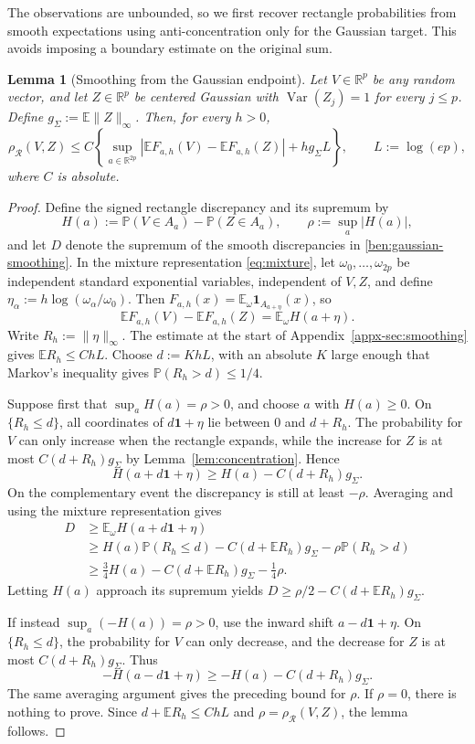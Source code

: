 \documentclass[11pt,letterpaper]{article}
\newtheorem{lemma}{Lemma}
\theoremstyle{remark}
\newcommand{\E}{\mathbb E}
\newcommand{\Pp}{\mathbb P}
\newcommand{\R}{\mathbb R}
\newcommand{\Var}{\operatorname{Var}}
\newcommand{\rh}{\rho_{\mathcal R}}
\newcommand{\ind}{\mathbf 1}
\begin{document}
The observations are unbounded, so we first recover rectangle
probabilities from smooth expectations using anti-concentration
only for the Gaussian target. This avoids imposing a boundary
estimate on the original sum.

\begin{lemma}[Smoothing from the Gaussian endpoint]\label{ben:smoothing}
Let $V\in\R^p$ be any random vector, and let $Z\in\R^p$
be centered Gaussian with $\Var(Z_j)=1$ for every $j\le p$.
Define $g_\Sigma:=\E\|Z\|_\infty$. Then, for every $h>0$,
\begin{equation}\label{ben:gaussian-smoothing}
 \rh(V,Z)\le C\left\{
 \sup_{a\in\R^{2p}}|\E F_{a,h}(V)-\E F_{a,h}(Z)|
       +hg_\Sigma L\right\},\qquad L:=\log(ep),
\end{equation}
where $C$ is absolute.
\end{lemma}
\begin{proof}
Define the signed rectangle discrepancy and its supremum by
\[
 H(a):=\Pp(V\in A_a)-\Pp(Z\in A_a),\qquad
 \rho:=\sup_a|H(a)|,
\]
and let $D$ denote the supremum of the smooth discrepancies in
\eqref{ben:gaussian-smoothing}. In the mixture representation
\eqref{eq:mixture}, let $\omega_0,\ldots,\omega_{2p}$ be
independent standard exponential variables, independent of $V,Z$,
and define $\eta_\alpha:=h\log(\omega_\alpha/\omega_0)$.
Then $F_{a,h}(x)=\E_\omega\ind_{A_{a+\eta}}(x)$, so
\[
 \E F_{a,h}(V)-\E F_{a,h}(Z)=\E_\omega H(a+\eta).
\]
Write $R_h:=\|\eta\|_\infty$. The estimate at the start of
Appendix~\ref{appx-sec:smoothing} gives $\E R_h\le ChL$.
Choose $d:=KhL$, with an absolute $K$ large enough that Markov's
inequality gives $\Pp(R_h>d)\le1/4$.

Suppose first that $\sup_aH(a)=\rho>0$, and choose $a$ with
$H(a)\ge0$. On $\{R_h\le d\}$, all coordinates of
$d\mathbf1+\eta$ lie between $0$ and $d+R_h$. The probability
for $V$ can only increase when the rectangle expands, while the
increase for $Z$ is at most $C(d+R_h)g_\Sigma$ by
Lemma~\ref{lem:concentration}. Hence
\[
 H(a+d\mathbf1+\eta)\ge H(a)-C(d+R_h)g_\Sigma.
\]
On the complementary event the discrepancy is still at least
$-\rho$. Averaging and using the mixture representation gives
\begin{align*}
 D&\ge\E_\omega H(a+d\mathbf1+\eta)\\
  &\ge H(a)\Pp(R_h\le d)
      -C(d+\E R_h)g_\Sigma-\rho\Pp(R_h>d)\\
  &\ge\tfrac34H(a)-C(d+\E R_h)g_\Sigma-\tfrac14\rho.
\end{align*}
Letting $H(a)$ approach its supremum yields
$D\ge\rho/2-C(d+\E R_h)g_\Sigma$.

If instead $\sup_a(-H(a))=\rho>0$, use the inward shift
$a-d\mathbf1+\eta$. On $\{R_h\le d\}$, the probability for
$V$ can only decrease, and the decrease for $Z$ is at most
$C(d+R_h)g_\Sigma$. Thus
\[
 -H(a-d\mathbf1+\eta)\ge-H(a)-C(d+R_h)g_\Sigma.
\]
The same averaging argument gives the preceding bound for $\rho$.
If $\rho=0$, there is nothing to prove. Since
$d+\E R_h\le ChL$ and $\rho=\rh(V,Z)$, the lemma follows.
\end{proof}
\end{document}
